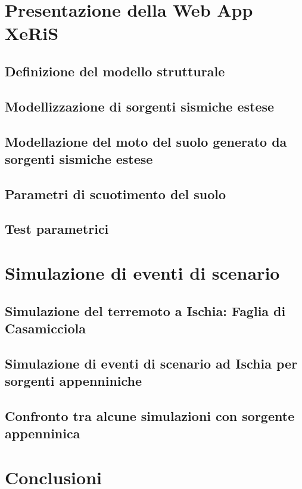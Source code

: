 \documentclass[a4paper,12pt,titlepage]{article}
\begin{document}
\section{Presentazione della Web App XeRiS}
\subsection{Definizione del modello strutturale}
\subsection{Modellizzazione di sorgenti sismiche estese}
\subsection{Modellazione del moto del suolo generato da sorgenti sismiche
estese}
\subsection{Parametri di scuotimento del suolo}
\subsection{Test parametrici}

\section{Simulazione di eventi di scenario}
\subsection{Simulazione del terremoto a Ischia: Faglia di Casamicciola}
\subsection{ Simulazione di eventi di scenario ad Ischia per sorgenti appenniniche}
\subsection{Confronto tra alcune simulazioni con sorgente appenninica}

\section*{Conclusioni}
\end{document}
